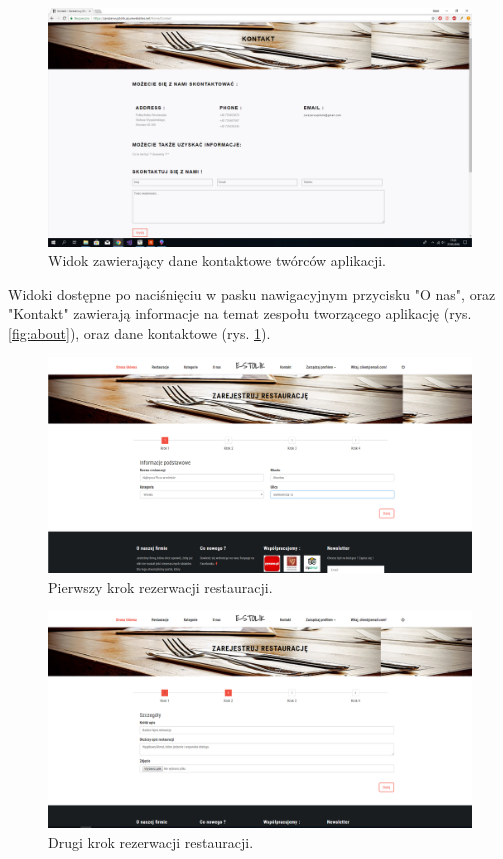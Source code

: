 \documentclass{article}
\begin{document}
\begin{figure}[H]
\centering
	\includegraphics[width=1.00\textwidth]{screens/contact.png}
	\caption{Widok zawierający dane kontaktowe twórców aplikacji.}
	\label{fig:contact}
\end{figure}

Widoki dostępne po naciśnięciu w pasku nawigacyjnym przycisku "O nas", oraz "Kontakt" zawierają informacje na temat zespołu tworzącego aplikację (rys. \ref{fig:about}), oraz dane kontaktowe (rys. \ref{fig:contact}).

\begin{figure}[H]
\centering
	\includegraphics[width=1.00\textwidth]{screens/register_rest_1.png}
	\caption{Pierwszy krok rezerwacji restauracji.}
	\label{fig:register_rest_1}
\end{figure}

\begin{figure}[H]
\centering
	\includegraphics[width=1.00\textwidth]{screens/register_rest_2.png}
	\caption{Drugi krok rezerwacji restauracji.}
	\label{fig:register_rest_2}
\end{figure}
\end{document}
